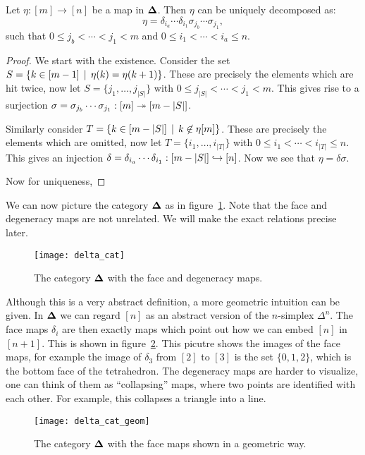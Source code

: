 \begin{lemma}
	\label{le:epimono}
	Let $\eta : [m] \to [n]$ be a map in $\mathbf{\Delta}$. Then $\eta$ can be uniquely decomposed as:
	$$ \eta = \delta_{i_a} \cdots \delta_{i_1} \sigma_{j_b} \cdots \sigma_{j_1}, $$
	such that $0 \leq j_b < \cdots < j_1 < m$ and $0 \leq i_1 < \cdots < i_a \leq n$.
\end{lemma}
\begin{proof}
	We start with the existence. Consider the set $S = \{ k \in [m-1] \,\mid\, \eta(k) = \eta(k+1) \}$. These are precisely the elements which are hit twice, now let $S = \{ j_1, \ldots, j_{|S|} \}$ with $0 \leq j_{|S|} < \cdots < j_1 < m$. This gives rise to a surjection $\sigma = \sigma_{j_b} \cdots \sigma_{j_1}: [m] \twoheadrightarrow [m-|S|]$.

	Similarly consider $T = \{ k \in [m - |S|] \,\mid\, k \not \in \eta[m] \}$. These are precisely the elements which are omitted, now let $T = \{ i_1, \ldots, i_{|T|} \}$ with $0 \leq i_1 < \cdots < i_{|T|} \leq n$. This gives an injection $\delta = \delta_{i_a} \cdots \delta_{i_1} : [m - |S|] \hookrightarrow [n]$. Now we see that $\eta = \delta\sigma$.

	Now for uniqueness, 
\end{proof}

We can now picture the category $\mathbf{\Delta}$ as in figure~\ref{fig:delta_cat}. Note that the face and degeneracy maps are not unrelated. We will make the exact relations precise later.

\begin{figure}[h!]
	\texttt{[image: delta\_cat]}
	\caption{The category $\mathbf{\Delta}$ with the face and degeneracy maps.}
	\label{fig:delta_cat}
\end{figure}

Although this is a very abstract definition, a more geometric intuition can be given. In $\mathbf{\Delta}$ we can regard $[n]$ as an abstract version of the $n$-simplex $\Delta^n$. The face maps $\delta_i$ are then exactly maps which point out how we can embed $[n]$ in $[n+1]$. This is shown in figure~\ref{fig:delta_cat_geom}. This picutre shows the images of the face maps, for example the image of $\delta_3$ from $[2]$ to $[3]$ is the set $\{0,1,2\}$, which is the bottom face of the tetrahedron. The degeneracy maps are harder to visualize, one can think of them as ``collapsing'' maps, where two points are identified with each other. For example, this collapses a triangle into a line.

\begin{figure}
	\texttt{[image: delta\_cat\_geom]}
	\caption{The category $\mathbf{\Delta}$ with the face maps shown in a geometric way.}
	\label{fig:delta_cat_geom}
\end{figure}

